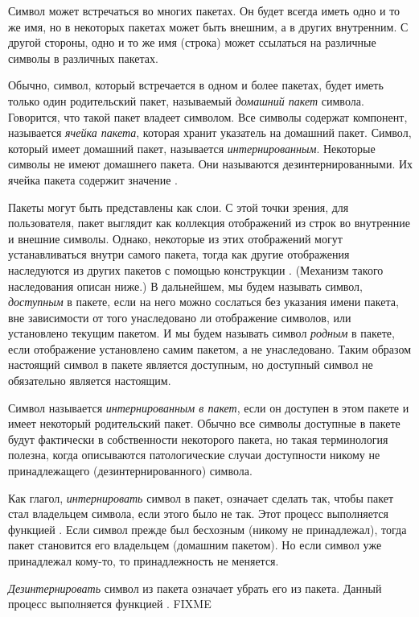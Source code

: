 Символ может встречаться во многих пакетах. Он будет всегда иметь одно и то же
имя, но в некоторых пакетах может быть внешним, а в других внутренним. С другой
стороны, одно и то же имя (строка) может ссылаться на различные символы в
различных пакетах.

Обычно, символ, который встречается в одном и более пакетах, будет иметь только
один родительский пакет, называемый \emph{домашний пакет} символа. Говорится,
что такой пакет владеет символом.
Все символы содержат компонент, называется \emph{ячейка пакета}, которая хранит
указатель на домашний пакет.
Символ, который имеет домашний пакет, называется \emph{интернированным}.
Некоторые символы не имеют домашнего пакета. Они называются
дезинтернированными. Их ячейка пакета содержит значение {\false}.

Пакеты могут быть представлены как слои. С этой точки зрения, для пользователя,
пакет выглядит как коллекция отображений из строк во внутренние и внешние
символы. Однако, некоторые из этих отображений могут устанавливаться внутри
самого пакета, тогда как другие отображения наследуются из других пакетов с
помощью конструкции . (Механизм такого наследования описан
ниже.) В дальнейшем, мы будем называть символ, \emph{доступным} в пакете, если
на него можно сослаться без указания имени пакета, вне зависимости от
того унаследовано ли отображение символов, или установлено текущим пакетом. И мы
будем называть символ \emph{родным} в пакете, если отображение установлено
самим пакетом, а не унаследовано. Таким образом настоящий символ в пакете
является доступным, но доступный символ не обязательно является настоящим.

Символ называется \emph{интернированным в пакет}, если он доступен в этом
пакете и имеет некоторый родительский пакет. Обычно все символы
доступные в пакете будут фактически в собственности некоторого пакета, но такая
терминология полезна, когда описываются патологические случаи доступности
никому не принадлежащего (дезинтернированного) символа.

Как глагол, \emph{интернировать} символ в пакет, означает сделать так, чтобы
пакет стал владельцем символа, если этого было не так.
Этот процесс выполняется функцией .
Если символ прежде был бесхозным (никому не принадлежал), тогда пакет становится
его владельцем (домашним пакетом). Но если символ уже принадлежал кому-то, то
принадлежность не меняется.

\emph{Дезинтернировать} символ из пакета означает убрать его из пакета. Данный
процесс выполняется функцией . FIXME

